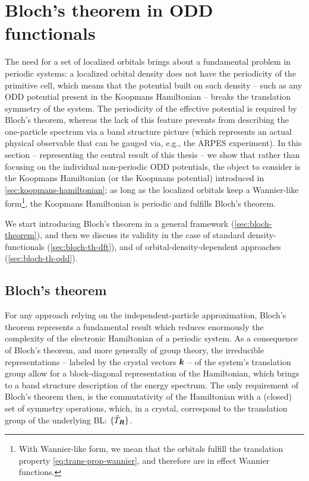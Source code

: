 \section{Bloch's theorem in ODD functionals\label{sec:bloch-theorem-section}}
The need for a set of localized orbitals brings about a fundamental problem in periodic systems: a localized orbital density does not have the periodicity of the primitive cell, which means that the potential built on such density -- such as any ODD potential present in the Koopmans Hamiltonian -- breaks the translation symmetry of the system. The periodicity of the effective potential is required by Bloch's theorem, whereas the lack of this feature prevents from describing the one-particle spectrum via a band structure picture (which represents an actual physical observable that can be gauged via, e.g., the ARPES experiment). In this section -- representing the central result of this thesis -- we show that rather than focusing on the individual non-periodic ODD potentials, the object to consider is the Koopmans Hamiltonian (or the Koopmans potential) introduced in \cref{sec:koopmans-hamiltonian}; as long as the localized orbitals keep a Wannier-like form\footnote{With Wannier-like form, we mean that the orbitals fulfill the translation property \eqref{eq:trans-prop-wannier}, and therefore are in effect Wannier functions.}, the Koopmans Hamiltonian is periodic and fulfills Bloch's theorem.

We start introducing Bloch's theorem in a general framework (\cref{sec:bloch-theorem}), and then we discuss its validity in the case of standard density-functionals (\cref{sec:bloch-th-dft}), and of orbital-density-dependent approaches (\cref{sec:bloch-th-odd}).

\subsection{Bloch's theorem\label{sec:bloch-theorem}}
For any approach relying on the independent-particle approximation, Bloch's theorem represents a fundamental result which reduces enormously the complexity of the electronic Hamiltonian of a periodic system. As a consequence of Bloch’s theorem, and more generally of group theory, the irreducible representations -- labeled by the crystal vectors ${\bm k}$ -- of the system's translation group allow for a block-diagonal representation of the Hamiltonian, which brings to a band structure description of the energy spectrum. The only requirement of Bloch's theorem then, is the commutativity of the Hamiltonian with a (closed) set of symmetry operations, which, in a crystal, correspond to the translation group of the underlying BL: $\{ \hat{T}_{{\bm R}} \}$.

